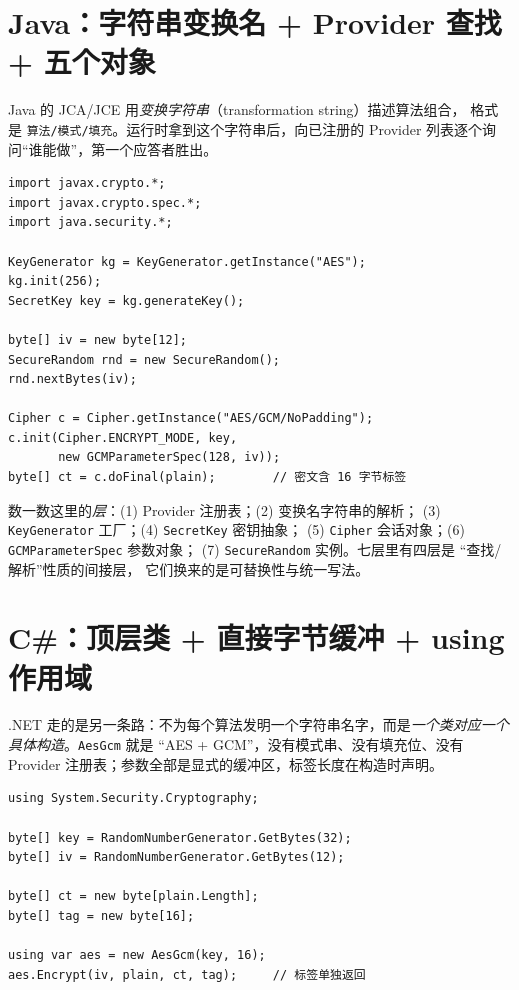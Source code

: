 \documentclass[12pt,a4paper,fontset=fandol]{ctexbook}
\newcommand{\Tp}[1]{\texttt{#1}}
\newcommand{\CSharp}{C\#}
\begin{document}
\section{Java：字符串变换名 + Provider 查找 + 五个对象}

Java 的 JCA/JCE 用\emph{变换字符串}（transformation string）描述算法组合，
格式是 \texttt{算法/模式/填充}。运行时拿到这个字符串后，向已注册的
Provider 列表逐个询问``谁能做''，第一个应答者胜出。

\begin{lstlisting}[style=javastyle,caption={Java 21：AES-256-GCM 加密一段字节}]
import javax.crypto.*;
import javax.crypto.spec.*;
import java.security.*;

KeyGenerator kg = KeyGenerator.getInstance("AES");
kg.init(256);
SecretKey key = kg.generateKey();

byte[] iv = new byte[12];
SecureRandom rnd = new SecureRandom();
rnd.nextBytes(iv);

Cipher c = Cipher.getInstance("AES/GCM/NoPadding");
c.init(Cipher.ENCRYPT_MODE, key,
       new GCMParameterSpec(128, iv));
byte[] ct = c.doFinal(plain);        // 密文含 16 字节标签
\end{lstlisting}

数一数这里的\emph{层}：(1) Provider 注册表；(2) 变换名字符串的解析；
(3) \Tp{KeyGenerator} 工厂；(4) \Tp{SecretKey} 密钥抽象；
(5) \Tp{Cipher} 会话对象；(6) \Tp{GCMParameterSpec} 参数对象；
(7) \Tp{SecureRandom} 实例。七层里有四层是 ``查找/解析''性质的间接层，
它们换来的是可替换性与统一写法。

\section{\CSharp{}：顶层类 + 直接字节缓冲 + using 作用域}

.NET 走的是另一条路：不为每个算法发明一个字符串名字，而是\emph{一个类对应一个
具体构造}。\Tp{AesGcm} 就是 ``AES + GCM''，没有模式串、没有填充位、没有 Provider
注册表；参数全部是显式的缓冲区，标签长度在构造时声明。

\begin{lstlisting}[style=csharpstyle,caption={.NET 8：同一任务的 C\# 写法}]
using System.Security.Cryptography;

byte[] key = RandomNumberGenerator.GetBytes(32);
byte[] iv = RandomNumberGenerator.GetBytes(12);

byte[] ct = new byte[plain.Length];
byte[] tag = new byte[16];

using var aes = new AesGcm(key, 16);
aes.Encrypt(iv, plain, ct, tag);     // 标签单独返回
\end{lstlisting}
\end{document}
